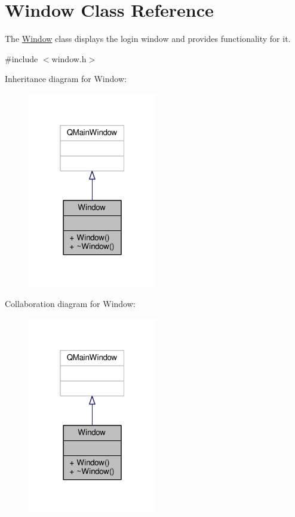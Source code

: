 \hypertarget{classWindow}{}\section{Window Class Reference}
\label{classWindow}


The \hyperlink{classWindow}{Window} class displays the login window and provides functionality for it.  




{\ttfamily \#include $<$window.\+h$>$}



Inheritance diagram for Window\+:\nopagebreak
\begin{figure}[H]
\begin{center}
\leavevmode
\includegraphics[width=160pt]{classWindow__inherit__graph}
\end{center}
\end{figure}


Collaboration diagram for Window\+:\nopagebreak
\begin{figure}[H]
\begin{center}
\leavevmode
\includegraphics[width=160pt]{classWindow__coll__graph}
\end{center}
\end{figure}
